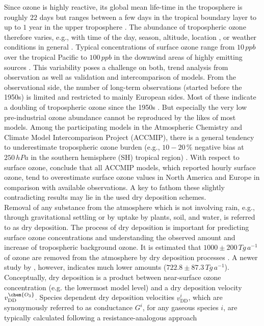\documentclass[gmd, manuscript]{copernicus}
\begin{document}
Since ozone is highly reactive, its global mean life-time in the troposphere is roughly $22$ days but ranges between a few days in the tropical boundary layer to up to $1$ year in the upper troposphere \citep{JGR:Stevenson2005,ACP:Young2013}. The abundance of tropospheric ozone therefore varies, e.g., with time of the day, season, altitude, location \citep{ACP:Schnell2015}, or weather conditions in general \citep{ACP:Otero2018}. Typical concentrations of surface ozone range from $10\,\unit{ppb}$ over the tropical Pacific to $100\,\unit{ppb}$ in the downwind areas of highly emitting sources \citep[Chapter 8]{IPCC2013}. This variability poses a challenge on both, trend analysis from observation as well as validation and intercomparison of models. From the observational side, the number of long-term observations (started before the 1950s) is limited and restricted to mainly European sides. Most of these indicate a doubling of tropospheric ozone since the 1950s \citep[Chapter 2]{IPCC2013}. But especially the very low pre-industrial ozone abundance cannot be reproduced by the likes of most models. Among the participating models in the Atmospheric Chemistry and Climate Model Intercomparison Project (ACCMIP), there is a general tendency to underestimate tropospheric ozone burden (e.g., $10-20\,\unit{\%}$ negative bias at $250\,\unit{hPa}$ in the southern hemisphere (SH) tropical region) \citep[Chapter 8]{IPCC2013}. With respect to surface ozone, \citet{ACP:Schnell2015} conclude that all ACCMIP models, which reported hourly surface ozone, tend to overestimate surface ozone values in North America and Europe in comparison with available observations. A key to fathom these slightly contradicting results may lie in the used dry deposition schemes.\\
Removal of any substance from the atmosphere which is not involving rain, e.g., through gravitational settling or by uptake by plants, soil, and water, is referred to as dry deposition. The process of dry deposition is important for predicting surface ozone concentrations and understanding the observed amount and increase of tropospheric background ozone. It is estimated that $1000 \pm 200\,\unit{Tg\,a^{-1}}$ of ozone are removed from the atmosphere by dry deposition processes \citep{ACP:Monks2015}. A newer study by \citet{ACP:Luhar2018}, however, indicates much lower amounts ($722.8 \pm 87.3\,\unit{Tg\,a^{-1}}$). Conceptually, dry deposition is a product between near-surface ozone concentration  (e.g. the lowermost model level) and a dry deposition velocity $v^\chem{O_3}_\text{DD}$. Species dependent dry deposition velocities $v^i_\text{DD}$, which are synonymously referred to as conductance $G^i$, for any gaseous species $i$, are typically calculated following a resistance-analogous approach
\end{document}
